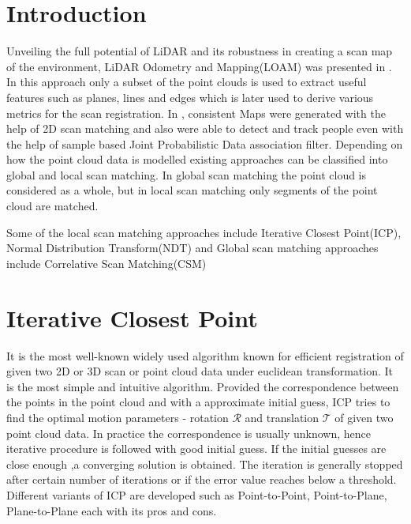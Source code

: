 \section*{Introduction}
Unveiling the full potential of LiDAR and its robustness in creating a scan map of the environment,
LiDAR Odometry and Mapping(LOAM) was presented in \cite{ZhangS14}. In this approach only a subset of the point clouds is used to extract useful features such as planes, lines and edges which is later 
used to derive various metrics for the scan registration. In \cite{D.Hahnel}, consistent Maps were generated with the help of 2D scan matching and also were able to detect and track people
even with the help of sample based Joint Probabilistic Data association filter.
Depending on how the point cloud data is modelled existing approaches can be classified into 
global and local scan matching. In global scan matching the point cloud is considered as a whole, but in local scan matching only segments of the point cloud are matched.

Some of the local scan matching approaches include Iterative Closest Point(ICP), Normal  Distribution Transform(NDT) and Global scan matching approaches include Correlative Scan Matching(CSM)

\section{Iterative Closest Point}
It is the most well-known widely used algorithm known for  efficient registration of given two 2D or 3D scan or point cloud data under euclidean transformation. It is the most simple and intuitive algorithm. Provided the correspondence between the points in the point cloud and with a  approximate initial guess, ICP tries to find the optimal motion parameters - rotation $\mathcal{R}$ and translation $\mathcal{T}$ of given two point cloud data. In practice the correspondence is usually unknown, hence iterative procedure is followed with good initial guess. If the initial guesses are close enough ,a converging solution is obtained. The iteration is generally stopped after certain number of iterations or if the error value reaches below a threshold. Different variants of ICP are developed such as Point-to-Point, Point-to-Plane, Plane-to-Plane each with its pros and cons. 


